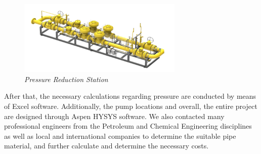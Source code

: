 \documentclass[12pt]{article}
\begin{document}
\begin{figure}[h!]
	\centering
	\includegraphics[width=0.7\textwidth]{assets/images/pressure_reduction_station.png}
	\caption{\textit{Pressure Reduction Station}}
	
 \end{figure}


 {\fontsize{12}{12}\selectfont 
	\hspace*{1em} After that, the necessary calculations regarding pressure are conducted by means of Excel software. Additionally, the pump locations and overall, the entire project are designed through Aspen HYSYS software.  We also contacted many professional engineers from the Petroleum and Chemical Engineering disciplines as well as local and international companies to determine the suitable pipe material, and further calculate and determine the necessary costs.
 	\\

 }

 
\end{document}
